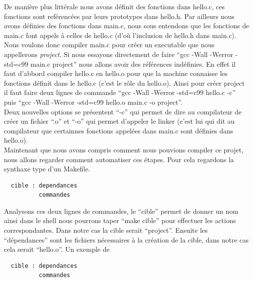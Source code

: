 \documentclass[a4paper,10pt]{article}
\begin{document}
\begin{spacing}{1.5}
\begin{center}
\end{center}
De manière plus littérale nous avons définit des fonctions dans hello.c, ces
fonctions sont reférencées par leurs prototypes dans hello.h. Par ailleurs nous
avons définies des fonctions dans main.c, nous sous entendons que les fonctions
de main.c font appels à celles de hello.c (d'où l'inclusion de hello.h dans
main.c). \\

Nous voulons donc compiler main.c pour créer un executable que nous appellerons
\textit{project}. Si nous essayons directement de faire ``gcc -Wall -Werror
-std=c99 main.c project'' nous allons avoir des références indéfinies. En effet
il faut d'abbord compiler hello.c en hello.o pour que la machine connaisse les
fonctions définit dans le hello.c (c'est le rôle du hello.o). Ainsi pour créer
project il faut faire deux lignes de commande ``gcc -Wall -Werror -std=c99
hello.c -c'' puis ``gcc -Wall -Werror -std=c99 hello.o main.c -o project''. \\

Deux nouvelles options se présentent ``-c'' qui permet de dire au compilateur de
créer un fichier ``.o'' et ``-o'' qui permet d'appeler le linker (c'est lui qui
dit au compilateur que certainnes fonctions appelées dans main.c sont définies
dans hello.o).\\

Maintenant que nous avons compris comment nous pouvions compiler ce projet, nous
allons regarder comment automatiser ces étapes. Pour cela regardons la synthaxe
type d'un Makefile.

\begin{lstlisting}
  cible : dependances
          commandes
\end{lstlisting}

Analysons ces deux lignes de commandes, le ``cible'' permet de donner un nom
ainsi dans le shell nous pourrons taper ``make cible'' pour effectuer les
actions correspondantes. Dans notre cas la cible serait ``project''. Ensuite les
``dépendances'' sont les fichiers nécessaires à la création de la cible, dans
notre cas cela serait ``hello.o''. Un exemple de

\begin{lstlisting}
  cible : dependances
          commandes
\end{lstlisting}

\newpage
\end{spacing}
\end{document}

